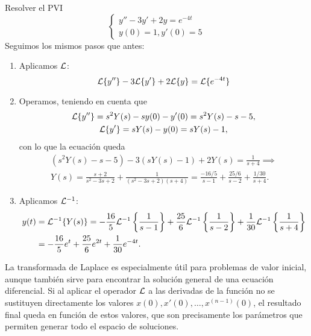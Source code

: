 \documentclass[../ecuaciones_diferenciales.tex]{subfiles}
\begin{document}
\begin{example}
	Resolver el PVI
	\[
		\begin{cases}
			y'' - 3y' + 2y = e^{-4t} \\
			y(0) = 1, y'(0) = 5
		\end{cases}
	\]
	Seguimos los mismos pasos que antes:
	\begin{enumerate}[1)]
		\item Aplicamos \(\mathcal{L}\):
		      \[\mathcal{L}\{y''\} - 3\mathcal{L}\{y'\} + 2\mathcal{L}\{y\} = \mathcal{L}\{e^{-4t}\}\]
		\item Operamos, teniendo en cuenta que
		      \begin{gather*}
			      \mathcal{L}\{y''\} = s^2Y(s) - sy(0) - y'(0) = s^2Y(s) - s - 5, \\
			      \mathcal{L}\{y'\} = sY(s) - y(0) = sY(s) - 1,
		      \end{gather*}
		      con lo que la ecuación queda
		      \begin{gather*}
			      \left(s^2Y(s) - s - 5\right) - 3\left(sY(s) - 1\right) + 2Y(s) =
			      \frac{1}{s+4} \implies \\
			      Y(s) = \frac{s+2}{s^2-3s+2} + \frac{1}{(s^2-3s+2)(s+4)} =
			      \frac{-16/5}{s-1} + \frac{25/6}{s-2} + \frac{1/30}{s+4}.
		      \end{gather*}
		\item Aplicamos \(\mathcal{L}^{-1}\):
		      \begin{align*}
			      y(t) & = \mathcal{L}^{-1}\{Y(s)\}
			      = -\frac{16}{5}\mathcal{L}^{-1}\left\{\frac{1}{s-1}\right\}
			      + \frac{25}{6}\mathcal{L}^{-1}\left\{\frac{1}{s-2}\right\}
			      + \frac{1}{30}\mathcal{L}^{-1}\left\{\frac{1}{s+4}\right\} \\
			           & = -\frac{16}{5}e^t + \frac{25}{6}e^{2t}
			      + \frac{1}{30}e^{-4t}.
		      \end{align*}
	\end{enumerate}
\end{example}

\begin{remark}
	La transformada de Laplace es especialmente útil para problemas de valor
	inicial, aunque también sirve para encontrar la solución general de una
	ecuación diferencial. Si al aplicar el operador \(\mathcal{L}\) a las derivadas de la
	función no se sustituyen directamente los valores
	\(x(0), x'(0), \dots, x^{(n-1)}(0)\), el resultado final queda en función de
	estos valores, que son precisamente los parámetros que permiten generar todo
	el espacio de soluciones.
\end{remark}
\end{document}
